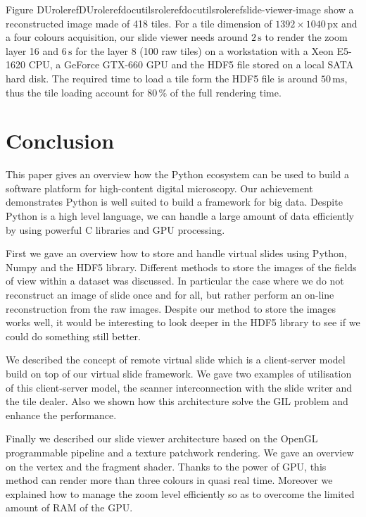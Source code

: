\documentclass[letterpaper,compsoc,twoside]{IEEEtran}
\providecommand*{\DUrole}[2]{\ifcsname DUrole#1\endcsname \csname DUrole#1\endcsname{#2}\else \ifcsname docutilsrole#1\endcsname \csname docutilsrole#1\endcsname{#2}\else #2\fi \fi }
\begin{document}
Figure \DUrole{ref}{slide-viewer-image} show a reconstructed image made of 418 tiles. For a tile dimension
of $1392 \times 1040\,\text{px}$ and a four colours acquisition, our slide viewer needs around
$2\,\text{s}$ to render the zoom layer 16 and $6\,\text{s}$ for the layer 8 (100 raw
tiles) on a workstation with a Xeon E5-1620 CPU, a GeForce GTX-660 GPU and the HDF5 file stored on a
local SATA hard disk. The required time to load a tile form the HDF5 file is around
$50\,\text{ms}$, thus the tile loading account for $80\,\%$ of the full rendering time.

\section{Conclusion\label{conclusion}}


This paper gives an overview how the Python ecosystem can be used to build a software platform for
high-content digital microscopy. Our achievement demonstrates Python is well suited to build a
framework for big data. Despite Python is a high level language, we can handle a large amount of
data efficiently by using powerful C libraries and GPU processing.

First we gave an overview how to store and handle virtual slides using Python, Numpy and the HDF5
library. Different methods to store the images of the fields of view within a dataset was
discussed. In particular the case where we do not reconstruct an image of slide once and for all,
but rather perform an on-line reconstruction from the raw images. Despite our method to store the
images works well, it would be interesting to look deeper in the HDF5 library to see if we could do
something still better.

We described the concept of remote virtual slide which is a client-server model build on top of our
virtual slide framework. We gave two examples of utilisation of this client-server model, the
scanner interconnection with the slide writer and the tile dealer. Also we shown how this
architecture solve the GIL problem and enhance the performance.

Finally we described our slide viewer architecture based on the OpenGL programmable pipeline and a
texture patchwork rendering. We gave an overview on the vertex and the fragment shader. Thanks to the power of
GPU, this method can render more than three colours in quasi real time. Moreover we explained how to
manage the zoom level efficiently so as to overcome the limited amount of RAM of the GPU.
\end{document}
